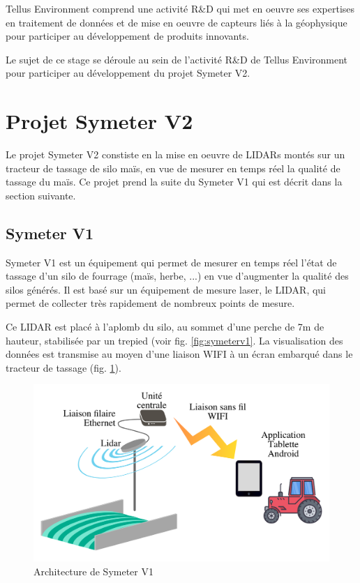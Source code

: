 \documentclass[12pt,a4paper]{report}
\begin{document}
	Tellus Environment comprend une activité R\&D qui met en oeuvre ses expertises en traitement de données et de mise en oeuvre de capteurs liés à la géophysique pour participer au développement de produits innovants.
	
	\para Le sujet de ce stage se déroule au sein de l'activité R\&D de Tellus Environment pour participer au développement du projet Symeter V2.

	\section{Projet Symeter V2}
	Le projet Symeter V2 constiste en la mise en oeuvre de LIDARs montés sur un tracteur de tassage de silo maïs, en vue de mesurer en temps réel la qualité de tassage du maïs. Ce projet prend la suite du Symeter V1 qui est décrit dans la section suivante.
	
		\subsection{Symeter V1}
		\label{sec:symeterv1}
		Symeter V1 est un équipement qui permet de mesurer en temps réel l'état de tassage d'un silo de fourrage (maïs, herbe, ...) en vue d'augmenter la qualité des silos générés. Il est basé sur un équipement de mesure laser, le LIDAR, qui permet de collecter très rapidement de nombreux points de mesure. 
		
		\para Ce LIDAR est placé à l'aplomb du silo, au sommet d'une perche de 7m de hauteur, stabilisée par un trepied (voir fig. \ref{fig:symeterv1}. La visualisation des données est transmise au moyen d'une liaison WIFI à un écran embarqué dans le tracteur de tassage (fig. \ref{fig:archigenv1}).
		
		\begin{figure}[h!]
			\centering
			\includegraphics[width=0.6\linewidth]{img/ArchiGenV1}
			\caption[archisymv1]{Architecture de Symeter V1}
			\label{fig:archigenv1}
		\end{figure}
		
\end{document}
